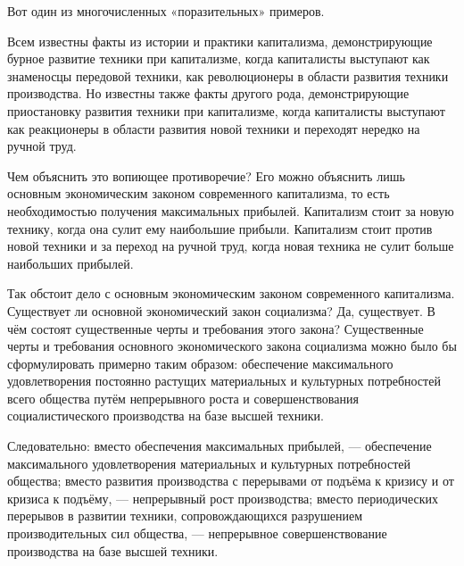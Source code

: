 \documentclass[12pt, a4paper, openany]{book}
\begin{document}
Вот один из многочисленных «поразительных» примеров.



Всем известны факты из истории и практики капитализма, демонстрирующие бурное развитие техники при капитализме, когда капиталисты выступают как знаменосцы передовой техники, как революционеры в области развития техники производства. Но известны также факты другого рода, демонстрирующие приостановку развития техники при капитализме, когда капиталисты выступают как реакционеры в области развития новой техники и переходят нередко на ручной труд.



Чем объяснить это вопиющее противоречие? Его можно объяснить лишь основным экономическим законом современного капитализма, то есть необходимостью получения максимальных прибылей. Капитализм стоит за новую технику, когда она сулит ему наибольшие прибыли. Капитализм стоит против новой техники и за переход на ручной труд, когда новая техника не сулит больше наибольших прибылей.



Так обстоит дело с основным экономическим законом современного капитализма. Существует ли основной экономический закон социализма? Да, существует. В чём состоят существенные черты и требования этого закона? Существенные черты и требования основного экономического закона социализма можно было бы сформулировать примерно таким образом: обеспечение максимального удовлетворения постоянно растущих материальных и культурных потребностей всего общества путём непрерывного роста и совершенствования социалистического производства на базе высшей техники.



Следовательно: вместо обеспечения максимальных прибылей, — обеспечение максимального удовлетворения материальных и культурных потребностей общества; вместо развития производства с перерывами от подъёма к кризису и от кризиса к подъёму, — непрерывный рост производства; вместо периодических перерывов в развитии техники, сопровождающихся разрушением производительных сил общества, — непрерывное совершенствование производства на базе высшей техники.
\end{document}
